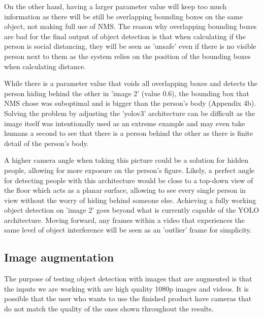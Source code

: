 \documentclass[12pt]{report}
\begin{document}
\vspace{2mm}

On the other hand, having a larger parameter value will keep too much information as there will be still be overlapping bounding boxes on the same object, not making full use of NMS. The reason why overlapping bounding boxes are bad for the final output of object detection is that when calculating if the person is social distancing, they will be seen as 'unsafe' even if there is no visible person next to them as the system relies on the position of the bounding boxes when calculating distance.

\vspace{2mm}

While there is a parameter value that voids all overlapping boxes and detects the person hiding behind the other in 'image 2' (value 0.6), the bounding box that NMS chose was suboptimal and is bigger than the person's body (Appendix 4b). Solving the problem by adjusting the 'yolov3' architecture can be difficult as the image itself was intentionally used as an extreme example and may even take humans a second to see that there is a person behind the other as there is finite detail of the person's body.

\vspace{2mm}

A higher camera angle when taking this picture could be a solution for hidden people, allowing for more exposure on the person's figure. Likely, a perfect angle for detecting people with this architecture would be close to a top-down view of the floor which acts as a planar surface, allowing to see every single person in view without the worry of hiding behind someone else. Achieving a fully working object detection on 'image 2'
 goes beyond what is currently capable of the YOLO architecture. Moving forward, any frames within a video that experiences the same level of object interference will be seen as an 'outlier' frame for simplicity. 

\subsection{Image augmentation}

The purpose of testing object detection with images that are augmented is that the inputs we are working with are high quality 1080p images and videos. It is possible that the user who wants to use the finished product have cameras that do not match the quality of the ones shown throughout the results.
\end{document}
